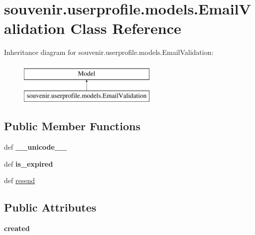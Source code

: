 \hypertarget{classsouvenir_1_1userprofile_1_1models_1_1EmailValidation}{\section{souvenir.\-userprofile.\-models.\-Email\-Validation Class Reference}
\label{classsouvenir_1_1userprofile_1_1models_1_1EmailValidation}
}
Inheritance diagram for souvenir.\-userprofile.\-models.\-Email\-Validation\-:\begin{figure}[H]
\begin{center}
\leavevmode
\includegraphics[height=2.000000cm]{classsouvenir_1_1userprofile_1_1models_1_1EmailValidation}
\end{center}
\end{figure}
\subsection*{Public Member Functions}
\begin{DoxyCompactItemize}
\item 
\hypertarget{classsouvenir_1_1userprofile_1_1models_1_1EmailValidation_a078b0d0419e2bf20d392167975eb1ca8}{def {\bfseries \-\_\-\-\_\-unicode\-\_\-\-\_\-}}\label{classsouvenir_1_1userprofile_1_1models_1_1EmailValidation_a078b0d0419e2bf20d392167975eb1ca8}

\item 
\hypertarget{classsouvenir_1_1userprofile_1_1models_1_1EmailValidation_aeeb038e9c54c1f6bbeee75f866cb4724}{def {\bfseries is\-\_\-expired}}\label{classsouvenir_1_1userprofile_1_1models_1_1EmailValidation_aeeb038e9c54c1f6bbeee75f866cb4724}

\item 
def \hyperlink{classsouvenir_1_1userprofile_1_1models_1_1EmailValidation_a798caeeb6b6d666dcf55bfb36e717ed0}{resend}
\end{DoxyCompactItemize}
\subsection*{Public Attributes}
\begin{DoxyCompactItemize}
\item 
\hypertarget{classsouvenir_1_1userprofile_1_1models_1_1EmailValidation_af822addb41213eeb9d5927f633fecc5f}{{\bfseries created}}\label{classsouvenir_1_1userprofile_1_1models_1_1EmailValidation_af822addb41213eeb9d5927f633fecc5f}

\end{DoxyCompactItemize}
